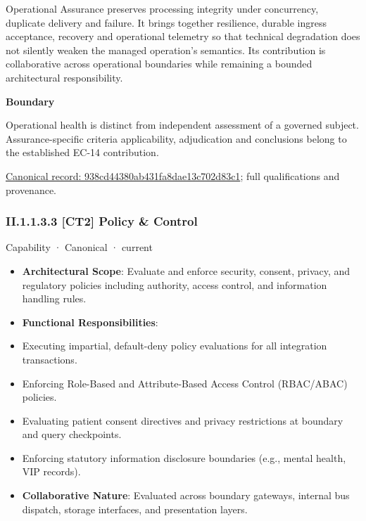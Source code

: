 Operational Assurance preserves processing integrity under concurrency, duplicate delivery and failure. It brings together resilience, durable ingress acceptance, recovery and operational telemetry so that technical degradation does not silently weaken the managed operation's semantics. Its contribution is collaborative across operational boundaries while remaining a bounded architectural responsibility.



\textbf{Boundary}



Operational health is distinct from independent assessment of a governed subject. Assurance-specific criteria applicability, adjudication and conclusions belong to the established EC-14 contribution.


{\footnotesize \href{../../../../continuum/strategy/capability/938cd44380ab431fa8dae13c702d83c1.md}{Canonical record: 938cd44380ab431fa8dae13c702d83c1}; full qualifications and provenance.}\par
\subsubsection*{II.1.1.3.3 [CT2] Policy \& Control}
\label{navigation:II.1.1.3.3}

\label{element:0c5d986cc948421a8bebcab3b74d108f}
{\small Capability · Canonical · current}\par

\begin{itemize}


\item \textbf{Architectural Scope}: Evaluate and enforce security, consent, privacy, and regulatory policies including authority, access control, and information handling rules.

\item \textbf{Functional Responsibilities}:

\item Executing impartial, default-deny policy evaluations for all integration transactions.

\item Enforcing Role-Based and Attribute-Based Access Control (RBAC/ABAC) policies.

\item Evaluating patient consent directives and privacy restrictions at boundary and query checkpoints.

\item Enforcing statutory information disclosure boundaries (e.g., mental health, VIP records).

\item \textbf{Collaborative Nature}: Evaluated across boundary gateways, internal bus dispatch, storage interfaces, and presentation layers.

\end{itemize}


